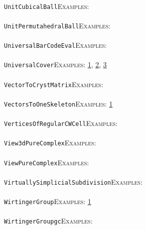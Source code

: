 \documentclass[a4paper,11pt]{report}
\begin{document}
{{ \\
 \texttt{UnitCubicalBall}{\nobreakspace}{\nobreakspace}{\nobreakspace}{\nobreakspace}\textsc{Examples:} \\
 \\
 \texttt{UnitPermutahedralBall}{\nobreakspace}{\nobreakspace}{\nobreakspace}{\nobreakspace}\textsc{Examples:} \\
 \\
 \texttt{UniversalBarCodeEval}{\nobreakspace}{\nobreakspace}{\nobreakspace}{\nobreakspace}\textsc{Examples:} \\
 \\
 \texttt{UniversalCover}{\nobreakspace}{\nobreakspace}{\nobreakspace}{\nobreakspace}\textsc{Examples:} \href{tutorial/chap3.html} {1}{\nobreakspace}, \href{../www/SideLinks/About/aboutCoveringSpaces.html} {2}{\nobreakspace}, \href{../www/SideLinks/About/aboutCoverinSpaces.html} {3}{\nobreakspace} \\
 \\
 \texttt{VectorToCrystMatrix}{\nobreakspace}{\nobreakspace}{\nobreakspace}{\nobreakspace}\textsc{Examples:} \\
 \\
 \texttt{VectorsToOneSkeleton}{\nobreakspace}{\nobreakspace}{\nobreakspace}{\nobreakspace}\textsc{Examples:} \href{tutorial/chap4.html} {1}{\nobreakspace} \\
 \\
 \texttt{VerticesOfRegularCWCell}{\nobreakspace}{\nobreakspace}{\nobreakspace}{\nobreakspace}\textsc{Examples:} \\
 \\
 \texttt{View3dPureComplex}{\nobreakspace}{\nobreakspace}{\nobreakspace}{\nobreakspace}\textsc{Examples:} \\
 \\
 \texttt{ViewPureComplex}{\nobreakspace}{\nobreakspace}{\nobreakspace}{\nobreakspace}\textsc{Examples:} \\
 \\
 \texttt{VirtuallySimplicialSubdivision}{\nobreakspace}{\nobreakspace}{\nobreakspace}{\nobreakspace}\textsc{Examples:} \\
 \\
 \texttt{WirtingerGroup}{\nobreakspace}{\nobreakspace}{\nobreakspace}{\nobreakspace}\textsc{Examples:} \href{../www/SideLinks/About/aboutQuandles.html} {1}{\nobreakspace} \\
 \\
 \texttt{WirtingerGroup{\textunderscore}gc}{\nobreakspace}{\nobreakspace}{\nobreakspace}{\nobreakspace}\textsc{Examples:} \\
}}
\end{document}
